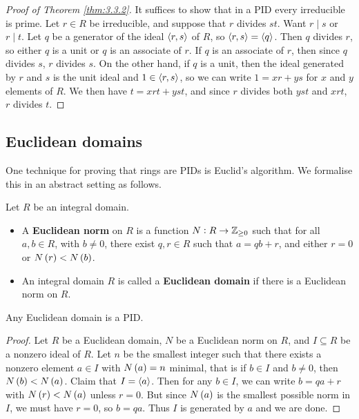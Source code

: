 \begin{proof}[Proof of Theorem \ref{thm:3.3.2}]
It suffices to show that in a PID every irreducible is prime. Let $ r \in R $ be irreducible, and suppose that $ r $ divides $ st $. Want $ r \mid s $ or $ r \mid t $. Let $ q $ be a generator of the ideal $ \left\langle r, s \right\rangle $ of $ R $, so $ \left\langle r, s \right\rangle = \left\langle q \right\rangle $. Then $ q $ divides $ r $, so either $ q $ is a unit or $ q $ is an associate of $ r $. If $ q $ is an associate of $ r $, then since $ q $ divides $ s $, $ r $ divides $ s $. On the other hand, if $ q $ is a unit, then the ideal generated by $ r $ and $ s $ is the unit ideal and $ 1 \in \left\langle r, s \right\rangle $, so we can write $ 1 = xr + ys $ for $ x $ and $ y $ elements of $ R $. We then have $ t = xrt + yst $, and since $ r $ divides both $ yst $ and $ xrt $, $ r $ divides $ t $.
\end{proof}


\subsection{Euclidean domains}

One technique for proving that rings are PIDs is Euclid's algorithm. We formalise this in an abstract setting as follows.

\begin{definition}
Let $ R $ be an integral domain.
\begin{itemize}
\item A \textbf{Euclidean norm} on $ R $ is a function $ N : R \to \mathbb{Z}_{\ge 0} $ such that for all $ a, b \in R $, with $ b \ne 0 $, there exist $ q, r \in R $ such that $ a = qb + r $, and either $ r = 0 $ or $ N\br{r} < N\br{b} $.
\item An integral domain $ R $ is called a \textbf{Euclidean domain} if there is a Euclidean norm on $ R $.
\end{itemize}
\end{definition}

\begin{theorem}
Any Euclidean domain is a PID.
\end{theorem}

\begin{proof}
Let $ R $ be a Euclidean domain, $ N $ be a Euclidean norm on $ R $, and $ I \subseteq R $ be a nonzero ideal of $ R $. Let $ n $ be the smallest integer such that there exists a nonzero element $ a \in I $ with $ N\br{a} = n $ minimal, that is if $ b \in I $ and $ b \ne 0 $, then $ N\br{b} < N\br{a} $. Claim that $ I = \left\langle a \right\rangle $. Then for any $ b \in I $, we can write $ b = qa + r $ with $ N\br{r} < N\br{a} $ unless $ r = 0 $. But since $ N\br{a} $ is the smallest possible norm in $ I $, we must have $ r = 0 $, so $ b = qa $. Thus $ I $ is generated by $ a $ and we are done.
\end{proof}

